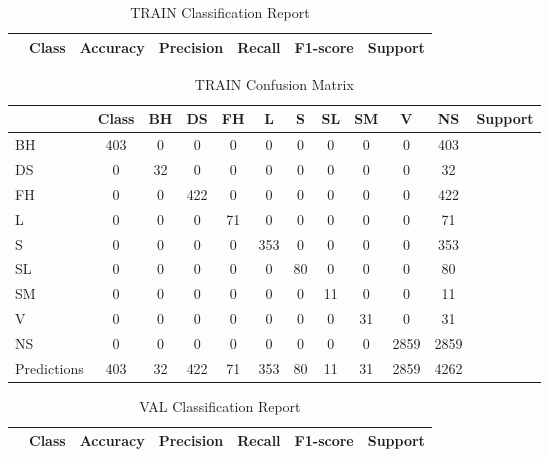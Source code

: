 \begin{table}[h]
\centering
\begin{tabular}{|l|c|c|c|c|c|} \hline
 & Class & Accuracy & Precision & Recall & F1-score & Support \\ \hline
\end{tabular}
\caption{TRAIN Classification Report}
\label{tab:train_report}
\end{table}

\begin{table}[h]
\centering
\begin{tabular}{|l|c|c|c|c|c|c|c|c|c|c|} \hline
 & Class & BH & DS & FH & L & S & SL & SM & V & NS & Support \\ \hline
BH & 403 & 0 & 0 & 0 & 0 & 0 & 0 & 0 & 0 & 403 \\ \hline
DS & 0 & 32 & 0 & 0 & 0 & 0 & 0 & 0 & 0 & 32 \\ \hline
FH & 0 & 0 & 422 & 0 & 0 & 0 & 0 & 0 & 0 & 422 \\ \hline
L & 0 & 0 & 0 & 71 & 0 & 0 & 0 & 0 & 0 & 71 \\ \hline
S & 0 & 0 & 0 & 0 & 353 & 0 & 0 & 0 & 0 & 353 \\ \hline
SL & 0 & 0 & 0 & 0 & 0 & 80 & 0 & 0 & 0 & 80 \\ \hline
SM & 0 & 0 & 0 & 0 & 0 & 0 & 11 & 0 & 0 & 11 \\ \hline
V & 0 & 0 & 0 & 0 & 0 & 0 & 0 & 31 & 0 & 31 \\ \hline
NS & 0 & 0 & 0 & 0 & 0 & 0 & 0 & 0 & 2859 & 2859 \\ \hline
Predictions & 403 & 32 & 422 & 71 & 353 & 80 & 11 & 31 & 2859 & 4262 \\ \hline
\end{tabular}
\caption{TRAIN Confusion Matrix}
\label{tab:train_conf_matrix}
\end{table}

\begin{table}[h]
\centering
\begin{tabular}{|l|c|c|c|c|c|} \hline
 & Class & Accuracy & Precision & Recall & F1-score & Support \\ \hline
\end{tabular}
\caption{VAL Classification Report}
\label{tab:val_report}
\end{table}

